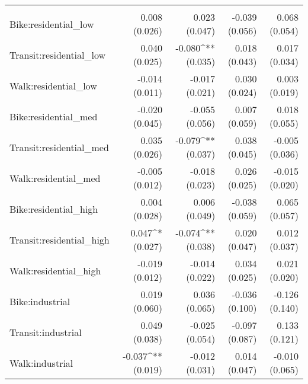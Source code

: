 \begin{table}[h]
{\begin{tabular}{l D{.}{.}{-3} D{.}{.}{3} D{.}{.}{-3} D{.}{.}{-3}}
	                     &                                                                 &                       &                  &  \\[-1.8ex]
	Bike:residential\_low      & 0.008$ $(0.026)                                                 & 0.023$ $(0.047)       & -0.039$ $(0.056) & 0.068$ $(0.054)      \\
	Transit:residential\_low   & 0.040$ $(0.025)                                                 & -0.080^{**}$ $(0.035) & 0.018$ $(0.043)  & 0.017$ $(0.034)      \\
	Walk:residential\_low      & -0.014$ $(0.011)                                                & -0.017$ $(0.021)      & 0.030$ $(0.024)  & 0.003$ $(0.019)      \\
	Bike:residential\_med      & -0.020$ $(0.045)                                                & -0.055$ $(0.056)      & 0.007$ $(0.059)  & 0.018$ $(0.055)      \\
	Transit:residential\_med   & 0.035$ $(0.026)                                                 & -0.079^{**}$ $(0.037) & 0.038$ $(0.045)  & -0.005$ $(0.036)     \\
	Walk:residential\_med      & -0.005$ $(0.012)                                                & -0.018$ $(0.023)      & 0.026$ $(0.025)  & -0.015$ $(0.020)     \\
	Bike:residential\_high    & 0.004$ $(0.028)                                                 & 0.006$ $(0.049)       & -0.038$ $(0.059) & 0.065$ $(0.057)      \\
	Transit:residential\_high & 0.047^{*}$ $(0.027)                                             & -0.074^{**}$ $(0.038) & 0.020$ $(0.047)  & 0.012$ $(0.037)      \\
	Walk:residential\_high    & -0.019$ $(0.012)                                                & -0.014$ $(0.022)      & 0.034$ $(0.025)  & 0.021$ $(0.020)      \\
	Bike:industrial          & 0.019$ $(0.060)                                                 & 0.036$ $(0.065)       & -0.036$ $(0.100) & -0.126$ $(0.140)     \\
	Transit:industrial      & 0.049$ $(0.038)                                                 & -0.025$ $(0.054)      & -0.097$ $(0.087) & 0.133$ $(0.121)      \\
	Walk:industrial          & -0.037^{**}$ $(0.019)                                           & -0.012$ $(0.031)      & 0.014$ $(0.047)  & -0.010$ $(0.065)     \\

\end{tabular}}
\end{table}
